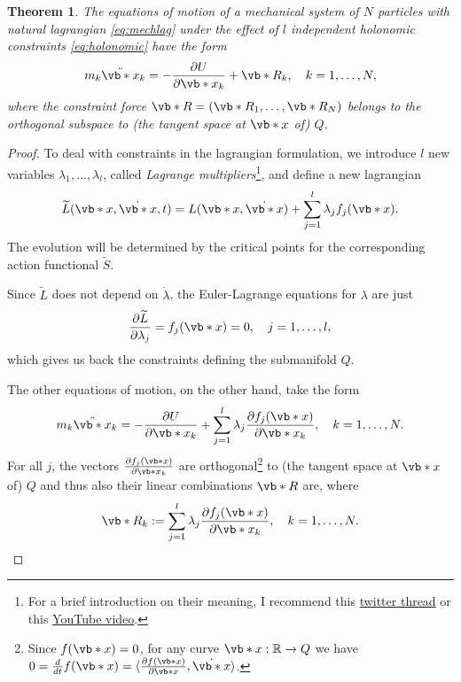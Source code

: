 \documentclass[english,fontsize=11pt,paper=b5]{scrbook}
\newtheorem{theorem}{Theorem}[chapter]
\theoremstyle{definition}
\begin{document}
    \begin{theorem}
      The equations of motion of a mechanical system of $N$ particles with natural lagrangian \eqref{eq:mechlag} under the effect of $l$ independent holonomic constraints \eqref{eq:holonomic} have the form
      \begin{equation}\label{eq:generalnewtonconstraint}
        m_k \ddot{\vb*{x}}_k = - \frac{\partial U}{\partial \vb*{x}_k} + \vb*{R}_k, \quad k=1, \ldots, N,
      \end{equation}
      where the \emph{constraint force} $\vb*{R} = (\vb*{R}_1, \ldots, \vb*{R}_N)$ belongs to the orthogonal subspace to (the tangent space at $\vb*{x}$ of) $Q$.
    \end{theorem}
    \begin{proof}
      To deal with constraints in the lagrangian formulation, we introduce $l$ new variables $\lambda_1, \ldots, \lambda_l$, called \emph{Lagrange multipliers}\footnote{For a brief introduction on their meaning, I recommend this \href{https://twitter.com/j\_bertolotti/status/1569324058633801729}{twitter thread} or this \href{https://www.youtube.com/watch?v=5A39Ht9Wcu0}{YouTube video}.}, and define a new lagrangian
      \begin{equation}
        \widetilde L(\vb*{x}, \dot{\vb*{x}}, t) = L(\vb*{x}, \dot{\vb*{x}}) + \sum_{j=1}^l \lambda_j f_j(\vb*{x}).
      \end{equation}
      The evolution will be determined by the critical points for the corresponding action functional $\widetilde S$.

      Since $\widetilde L$ does not depend on $\dot\lambda$, the Euler-Lagrange equations for $\lambda$ are just
      \begin{equation}
        \frac{\partial \widetilde L}{\partial \lambda_j} = f_j(\vb*{x}) = 0,\quad j=1,\ldots,l,
      \end{equation}
      which gives us back the constraints defining the submanifold $Q$.

      The other equations of motion, on the other hand, take the form
      \begin{equation}\label{eq:newtconstr}
        m_k \ddot{\vb*{x}}_k = -\frac{\partial U}{\partial\vb*{x}_k} + \sum_{j=1}^l \lambda_j \frac{\partial f_j(\vb*{x})}{\partial \vb*{x}_k},
        \quad k=1,\ldots,N.
      \end{equation}
      For all $j$, the vectors $\frac{\partial f_j(\vb*{x})}{\partial \vb*{x}_k}$ are orthogonal\footnote{Since $f(\vb*{x}) = 0$, for any curve $\vb*{x}:\mathbb{R}\to Q$ we have $0 = \frac{d}{dt} f(\vb*{x}) = \langle \frac{\partial f(\vb*{x})}{\partial \vb*{x}}, \dot{\vb*{x}} \rangle$.} to (the tangent space at $\vb*{x}$ of) $Q$ and thus also their linear combinations $\vb*{R}$ are, where
      \begin{equation}
        \vb*{R}_k := \sum_{j=1}^l \lambda_j \frac{\partial f_j(\vb*{x})}{\partial \vb*{x}_k},
        \quad k=1,\ldots,N.
      \end{equation}
    \end{proof}
\end{document}
